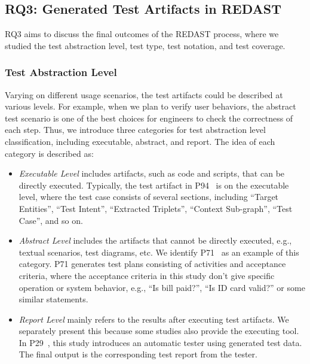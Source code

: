 \subsection{RQ3: Generated Test Artifacts in REDAST}
 
 RQ3 aims to discuss the final outcomes of the REDAST process, where we studied the test abstraction level, test type, test notation, and test coverage.

\subsubsection{Test Abstraction Level}


Varying on different usage scenarios, the test artifacts could be described at various levels. For example, when we plan to verify user behaviors, the abstract test scenario is one of the best choices for engineers to check the correctness of each step. Thus, we introduce three categories for test abstraction level classification, including executable, abstract, and report. The idea of each category is described as:

\begin{itemize}
    \item \textit{Executable Level} includes artifacts, such as code and scripts, that can be directly executed. Typically, the test artifact in P94~ is on the executable level, where the test case consists of several sections, including ``Target Entities'', ``Test Intent'', ``Extracted Triplets'', ``Context Sub-graph'', ``Test Case'', and so on. %
    \item \textit{Abstract Level} includes the artifacts that cannot be directly executed, e.g., textual scenarios, test diagrams, etc. We identify P71~ as an example of this category. P71 generates test plans consisting of activities and acceptance criteria, where the acceptance criteria in this study don't give specific operation or system behavior, e.g., ``Is bill paid?'', ``Is ID card valid?'' or some similar statements.
    \item \textit{Report Level} mainly refers to the results after executing test artifacts. We separately present this because some studies also provide the executing tool. In P29~, this study introduces an automatic tester using generated test data. The final output is the corresponding test report from the tester.
\end{itemize}


